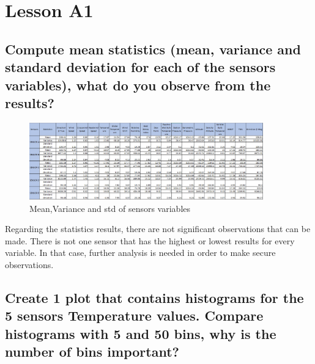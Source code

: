 \documentclass[a4paper,12pt]{article} %
\begin{document}
\section{ Lesson A1}

\subsection{Compute mean statistics (mean, variance and standard deviation for each of the sensors variables), what do you observe from the results?}

\begin{figure}[H] %
	\centering %
	\includegraphics[width=0.9\textwidth]{Statistics_Matrix.png} 
	\caption{Mean,Variance and std of sensors variables} %
\end{figure}

Regarding the statistics results, there are not significant observations that can be made. There is not one sensor that has the highest or lowest results for every variable. In that case, further analysis is needed in order to make secure observations.

\subsection{Create 1 plot that contains histograms for the 5 sensors Temperature values. Compare histograms with 5 and 50 bins, why is the number of bins important?}
\end{document}
